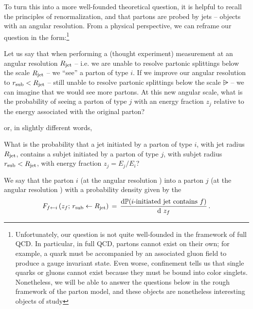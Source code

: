 To turn this into a more well-founded theoretical question, it is helpful to recall the principles of renormalization, and that partons are probed by jets -- objects with an angular resolution.
%
From a physical perspective, we can reframe our question in the form:\footnote{
    Unfortunately, our question is not quite well-founded in the framework of full QCD.
    In particular, in full QCD, partons cannot exist on their own;
    for example, a quark must be accompanied by an associated gluon field to produce a gauge invariant state.
    Even worse, confinement tells us that single quarks or gluons cannot exist because they must be bound into color singlets.
    Nonetheless, we will be able to answer the questions below in the rough framework of the parton model, and these objects are nonetheless interesting objects of study
}
\begin{question*}{}{}
    Let us say that when performing a (thought experiment) measurement at an angular resolution \(R_\text{jet}\) -- i.e. we are unable to resolve partonic splittings below the scale \(R_\text{jet}\) -- we ``see'' a parton of type \(i\).
    If we improve our angular resolution to \(r_\text{sub} < R_\text{jet}\) -- still unable to resolve partonic splittings below the scale \(\rsub\) -- we can imagine that we would see more partons.
    At this new angular scale, what is the probability of seeing a parton of type \(j\) with an energy fraction \(z_j\) relative to the energy associated with the original parton?
\end{question*}
%
\noindent
or, in slightly different words,
%
\begin{question*}{}{}
    What is the probability that a jet initiated by a parton of type \(i\), with jet radius \(R_\text{jet}\), contains a subjet initiated by a parton of type \(j\), with subjet radius \(r_\text{sub} < R_\text{jet}\), with energy fraction \(z_j = E_j / E_i\)?
\end{question*}

We say that the parton \(i\) (at the angular resolution \Rjet)  into a parton \(j\) (at the angular resolution \rsub) with a probability density given by the 
\begin{align}
    \label{eq:fragmentation_function}
    F_{f \leftarrow i}
    \le(z_f; \, \rsub \leftarrow \Rjet\ri)
    \,
    =
    \,
    \frac{\dd\mathbb{P}(i\text{-initiated jet contains }f)}{\dd  \,\,z_f}
    \,.
\end{align}




